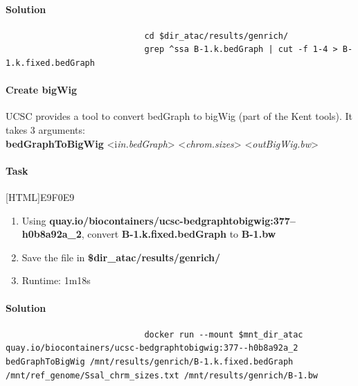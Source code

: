 \documentclass[12pt]{article}
\begin{document}
				\paragraph{Solution}
					
					\begin{minipage}{\linewidth}
						\begin{lstlisting}
							cd $dir_atac/results/genrich/
							grep ^ssa B-1.k.bedGraph | cut -f 1-4 > B-1.k.fixed.bedGraph
						\end{lstlisting}
					\end{minipage}
					
					
			\paragraph{Create bigWig}
					UCSC provides a tool to convert bedGraph to bigWig (part of the Kent tools). It takes 3 arguments:\\
					
					 \textbf{bedGraphToBigWig} <i\textit{in.bedGraph}> <\textit{chrom.sizes}> <\textit{outBigWig.bw}>\\
				
					
				\paragraph{Task}

					[HTML]{E9F0E9}{\parbox{\linewidth}{%
							\begin{enumerate}
								\item  Using \textbf{quay.io/biocontainers/ucsc-bedgraphtobigwig:377--h0b8a92a\_2}, convert \textbf{B-1.k.fixed.bedGraph} to \textbf{B-1.bw}
								\item  Save the file in \textbf{\$dir\_atac/results/genrich/}
								\item Runtime: 1m18s
							\end{enumerate}
					}}
					
					\paragraph{Solution}
	
					\begin{minipage}{\linewidth}
						\begin{lstlisting}
							docker run --mount $mnt_dir_atac quay.io/biocontainers/ucsc-bedgraphtobigwig:377--h0b8a92a_2 bedGraphToBigWig /mnt/results/genrich/B-1.k.fixed.bedGraph /mnt/ref_genome/Ssal_chrm_sizes.txt /mnt/results/genrich/B-1.bw
						\end{lstlisting}
					\end{minipage}
		
\end{document}
